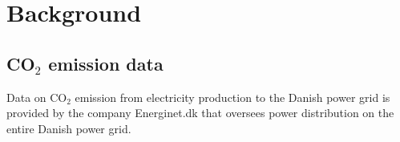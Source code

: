 \documentclass[Main]{subfiles}
\begin{document}
\section{Background} %
\label{sec:background}

	\subsection{CO$_2$ emission data} %
	\label{sub:c02_emission_data}

		Data on CO$_2$ emission from electricity production to the Danish power grid is provided by the company Energinet.dk that oversees power distribution on the entire Danish power grid.



\end{document}
